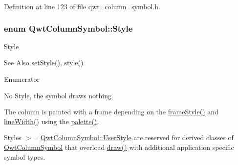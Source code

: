 Definition at line 123 of file qwt\-\_\-column\-\_\-symbol.\-h.

\hypertarget{class_qwt_column_symbol_aaace508375eef3ee23ed6c47b1d65ef2}{
\subsubsection[{Style}]{\setlength{\rightskip}{0pt plus 5cm}enum {\bf Qwt\-Column\-Symbol\-::\-Style}}}\label{class_qwt_column_symbol_aaace508375eef3ee23ed6c47b1d65ef2}
Style \begin{DoxySeeAlso}{See Also}
\hyperlink{class_qwt_column_symbol_a3e2c72514fdc2e857ee2a34bc9f96e93}{set\-Style()}, \hyperlink{class_qwt_column_symbol_a3cf6f4e696a6df0936160d6bdb8e6b25}{style()} 
\end{DoxySeeAlso}
\begin{Desc}
\item[Enumerator]\par
\begin{description}
\item[{\em 
\hypertarget{class_qwt_column_symbol_aaace508375eef3ee23ed6c47b1d65ef2a3c16d900e0dcfc18f174f4120136cb5b}{No\-Style}\label{class_qwt_column_symbol_aaace508375eef3ee23ed6c47b1d65ef2a3c16d900e0dcfc18f174f4120136cb5b}
}]No Style, the symbol draws nothing. \item[{\em 
\hypertarget{class_qwt_column_symbol_aaace508375eef3ee23ed6c47b1d65ef2ad21d1b393a2474a1caa6a9d83daa8f21}{Box}\label{class_qwt_column_symbol_aaace508375eef3ee23ed6c47b1d65ef2ad21d1b393a2474a1caa6a9d83daa8f21}
}]The column is painted with a frame depending on the \hyperlink{class_qwt_column_symbol_a9e13ae8a8b07556ee2de672c7067606a}{frame\-Style()} and \hyperlink{class_qwt_column_symbol_afe6850ba90ade0fdf61edd203e49206d}{line\-Width()} using the \hyperlink{class_qwt_column_symbol_afe13154e29f882e77fedf8bbc3280f7e}{palette()}. \item[{\em 
\hypertarget{class_qwt_column_symbol_aaace508375eef3ee23ed6c47b1d65ef2aa9a5f984f62fb53ce3eeea35be3b0536}{User\-Style}\label{class_qwt_column_symbol_aaace508375eef3ee23ed6c47b1d65ef2aa9a5f984f62fb53ce3eeea35be3b0536}
}]Styles $>$= \hyperlink{class_qwt_column_symbol_aaace508375eef3ee23ed6c47b1d65ef2aa9a5f984f62fb53ce3eeea35be3b0536}{Qwt\-Column\-Symbol\-::\-User\-Style} are reserved for derived classes of \hyperlink{class_qwt_column_symbol}{Qwt\-Column\-Symbol} that overload \hyperlink{class_qwt_column_symbol_a647960f89c1f2f8524789d7ad90482d8}{draw()} with additional application specific symbol types. \end{description}
\end{Desc}


